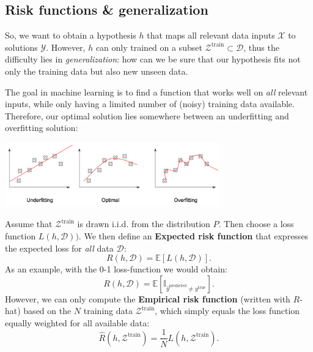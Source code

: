 \documentclass{article}
\begin{document}
\subsection{Risk functions \& generalization}
So, we want to obtain a hypothesis $h$ that maps all relevant data inputs $\mathcal{X}$ to solutions $\mathcal{Y}$. However, $h$ can only trained on a subset $\mathcal{Z}^\text{train}\subset\mathcal{D}$, thus the difficulty lies in \textit{generalization}: how can we be sure that our hypothesis fits not only the training data but also new unseen data.
\begin{testexample}
    The goal in machine learning is to find a function that works well on \textit{all} relevant inputs, while only having a limited number of (noisy) training data available. Therefore, our optimal solution lies somewhere between an underfitting and overfitting solution:\\
    \begin{center}\includegraphics[width=0.7\textwidth]{Overfitting.png}\end{center}\vspace{-0.5cm}
\end{testexample}
{\flushleft Assume} that $\mathcal{Z}^\text{train}$ is drawn i.i.d. from the distribution $P$. Then choose a loss function $L(h,\mathcal{D}))$. We then define an \textbf{Expected risk function} that expresses the expected loss for \textit{all} data $\mathcal{D}$:
\begin{equation}
    R(h,\mathcal{D}) = \mathbb{E}[L(h,\mathcal{D})].\label{eq:exprisk}
\end{equation}
As an example, with the 0-1 loss-function we would obtain:
\begin{equation}
    R(h,\mathcal{D}) = \mathbb{E}[\mathbb{I}_{\hat{y}^\text{predicted}\neq y^\text{true}}].
\end{equation}
However, we can only compute the \textbf{Empirical risk function} (written with $R$-hat) based on the $N$ training data $\mathcal{Z}^\text{train}$, which simply equals the loss function equally weighted for all available data:
\begin{equation}
    \hat{R}(h,\mathcal{Z}^\text{train}) = \frac{1}{N} L(h,\mathcal{Z}^\text{train})\label{eq:emprisk}.
\end{equation}
\end{document}
